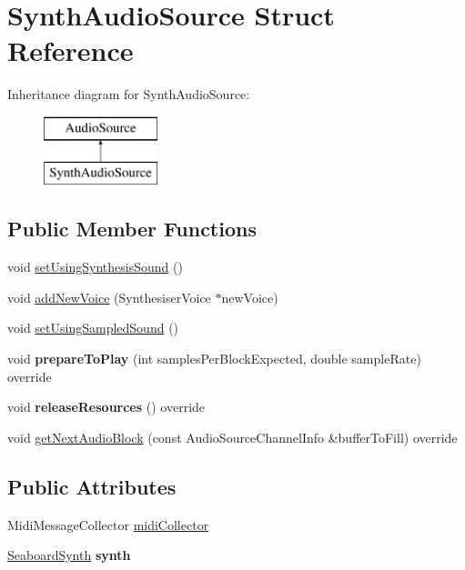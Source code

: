 \hypertarget{struct_synth_audio_source}{\section{Synth\-Audio\-Source Struct Reference}
\label{struct_synth_audio_source}
}
Inheritance diagram for Synth\-Audio\-Source\-:\begin{figure}[H]
\begin{center}
\leavevmode
\includegraphics[height=2.000000cm]{struct_synth_audio_source}
\end{center}
\end{figure}
\subsection*{Public Member Functions}
\begin{DoxyCompactItemize}
\item 
void \hyperlink{struct_synth_audio_source_ada38fa8e024834b76bbc7d57870e1259}{set\-Using\-Synthesis\-Sound} ()
\item 
void \hyperlink{struct_synth_audio_source_ab05f34320b8f2ef573bd31119a766e62}{add\-New\-Voice} (Synthesiser\-Voice $\ast$new\-Voice)
\item 
void \hyperlink{struct_synth_audio_source_a541b410a17592aac9e477c660fea67bc}{set\-Using\-Sampled\-Sound} ()
\item 
\hypertarget{struct_synth_audio_source_a8fcdbda283f67acd9c9461b998b305e7}{void {\bfseries prepare\-To\-Play} (int samples\-Per\-Block\-Expected, double sample\-Rate) override}\label{struct_synth_audio_source_a8fcdbda283f67acd9c9461b998b305e7}

\item 
\hypertarget{struct_synth_audio_source_ac443459932ce478082ddc5c2765d919b}{void {\bfseries release\-Resources} () override}\label{struct_synth_audio_source_ac443459932ce478082ddc5c2765d919b}

\item 
void \hyperlink{struct_synth_audio_source_a4126f6e765478013a6c060b722af3d68}{get\-Next\-Audio\-Block} (const Audio\-Source\-Channel\-Info \&buffer\-To\-Fill) override
\end{DoxyCompactItemize}
\subsection*{Public Attributes}
\begin{DoxyCompactItemize}
\item 
Midi\-Message\-Collector \hyperlink{struct_synth_audio_source_aac0466f0cf4680f25de5cd2789b4bb7c}{midi\-Collector}
\item 
\hypertarget{struct_synth_audio_source_a791f6c2b8ce8f5964314f4107acc1304}{\hyperlink{struct_seaboard_synth}{Seaboard\-Synth} {\bfseries synth}}\label{struct_synth_audio_source_a791f6c2b8ce8f5964314f4107acc1304}

\end{DoxyCompactItemize}


